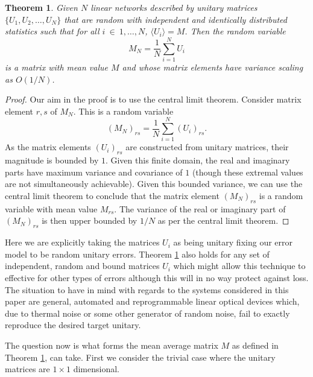 \documentclass[aps,pra,twocolumn,superscriptaddress,numerical,floatfix]{revtex4-1}
\newtheorem{theorem}{Theorem}
\begin{document}
\begin{theorem}
\label{Theorem 1}
Given $N$ linear networks described by unitary matrices $\{U_1,U_2,\ldots,U_N\}$ that are random with independent and identically distributed statistics such that for all $i~\in~{1,\ldots,N}$, $\langle U_i \rangle = M$.  Then the random variable 
\begin{equation}
	\label{sum_unitary}
	M_{N}=\frac{1}{N}\sum_{i=1}^{N}U_{i}
\end{equation}
is a matrix with mean value $M$ and whose matrix elements have variance scaling as $O(1/N)$.
\end{theorem}

\begin{proof}\label{Proof 1}
Our aim in the proof is to use the central limit theorem.  Consider matrix element $r,s$ of $M_N$.  This is a random variable
\begin{equation}
	\left(M_N\right)_{rs} = \frac{1}{N} \sum_{i=1}^N \left(U_i\right)_{rs}.
\end{equation}
As the matrix elements $(U_i)_{rs}$ are constructed from unitary matrices, their magnitude is bounded by $1$.  Given this finite domain, the real and imaginary parts have maximum variance and covariance of $1$ (though these extremal values are not simultaneously achievable).  Given this bounded variance, we can use the central limit theorem to conclude that the matrix element $\left(M_N\right)_{rs}$ is a random variable with mean value $M_{rs}$.
The variance of the real or imaginary part of $(M_N)_{rs}$ is then upper bounded by $1/N$ as per the central limit theorem.
\end{proof}

Here we are explicitly taking the matrices $U_i$ as being unitary fixing our error model to be random unitary errors. Theorem \ref{Theorem 1} also holds for any set of independent, random and bound matrices $U_i$ which might allow this technique to effective for other types of errors although this will in no way protect against loss. The situation to have in mind with regards to the systems considered in this paper are general, automated and reprogrammable linear optical devices which, due to thermal noise or some other generator of random noise, fail to exactly reproduce the desired target unitary.

The question now is what forms the mean average matrix $M$ as defined in Theorem \ref{Theorem 1}, can take. First we consider the trivial case where the unitary matrices are $1 \times 1$ dimensional.
\end{document}
